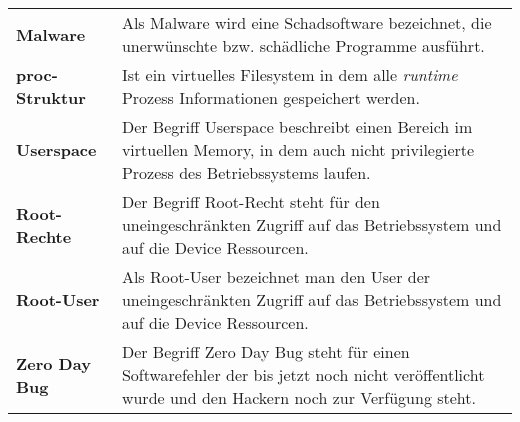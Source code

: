 \begin{table*}[htbp]
\begin{center}
\begin{tabular}{p{3cm}p{12cm}}
		  \textbf{Malware} &  Als Malware wird eine Schadsoftware bezeichnet, die unerwünschte bzw. schädliche Programme ausführt.\\
		 
		  \textbf{proc-Struktur} & Ist ein virtuelles Filesystem in dem alle \textit{\glqq runtime\grqq{}} Prozess Informationen gespeichert werden.\\
		  
		  \textbf{Userspace} & Der Begriff Userspace beschreibt einen Bereich im virtuellen Memory, in dem auch nicht privilegierte Prozess des Betriebssystems laufen.\\
		  
		 \textbf{Root-Rechte} &  Der Begriff Root-Recht steht für den uneingeschränkten Zugriff auf das Betriebssystem und auf die Device Ressourcen.\\
		 \textbf{Root-User} &  Als Root-User bezeichnet man den User der uneingeschränkten Zugriff auf das Betriebssystem und auf die Device Ressourcen.\\ 
		  
		 \textbf{Zero Day Bug} &  Der Begriff Zero Day Bug steht für einen Softwarefehler der bis jetzt noch nicht veröffentlicht wurde und den Hackern noch zur Verfügung steht.\\
		  
		\end{tabular}		    
    \end{center}
\end{table*}